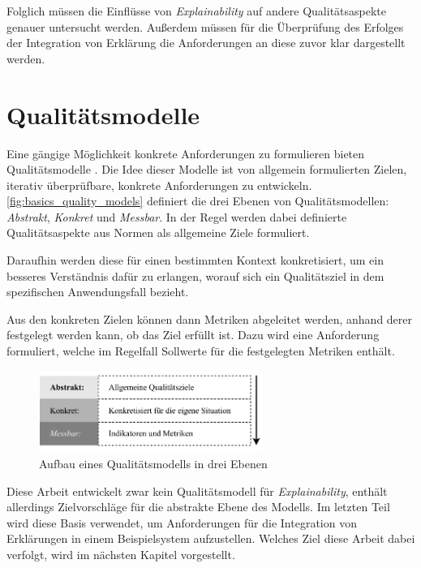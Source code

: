 Folglich müssen die Einflüsse von \textit{Explainability} auf andere Qualitätsaspekte genauer untersucht werden. Außerdem müssen für die Überprüfung des Erfolges der Integration von Erklärung die Anforderungen an diese zuvor klar dargestellt werden.

\section{Qualitätsmodelle}
\label{sec:basics_quality_models}

Eine gängige Möglichkeit konkrete Anforderungen zu formulieren bieten Qualitätsmodelle \cite{schneider2012abenteuer}. Die Idee dieser Modelle ist von allgemein formulierten Zielen, iterativ überprüfbare, konkrete Anforderungen zu entwickeln. \autoref{fig:basics_quality_models} definiert die drei Ebenen von Qualitätsmodellen: \textit{Abstrakt}, \textit{Konkret} und \textit{Messbar}. In der Regel werden dabei definierte Qualitätsaspekte aus Normen als allgemeine Ziele formuliert.

Daraufhin werden diese für einen bestimmten Kontext konkretisiert, um ein besseres Verständnis dafür zu erlangen, worauf sich ein Qualitätsziel in dem spezifischen Anwendungsfall bezieht.

Aus den konkreten Zielen können dann Metriken abgeleitet werden, anhand derer festgelegt werden kann, ob das Ziel erfüllt ist. Dazu wird eine Anforderung formuliert, welche im Regelfall Sollwerte für die festgelegten Metriken enthält.

\begin{figure}[htb!]
    \centering
    \includegraphics[width=0.65\textwidth]{contents/02_basics/res/quality_models.pdf}
    \caption{Aufbau eines Qualitätsmodells in drei Ebenen \cite[S. 34, ][]{schneider2012abenteuer}}
    \label{fig:basics_quality_models}
\end{figure}

Diese Arbeit entwickelt zwar kein Qualitätsmodell für \textit{Explainability}, enthält allerdings Zielvorschläge für die abstrakte Ebene des Modells. Im letzten Teil wird diese Basis verwendet, um Anforderungen für die Integration von Erklärungen in einem Beispielsystem aufzustellen. Welches Ziel diese Arbeit dabei verfolgt, wird im nächsten Kapitel vorgestellt.